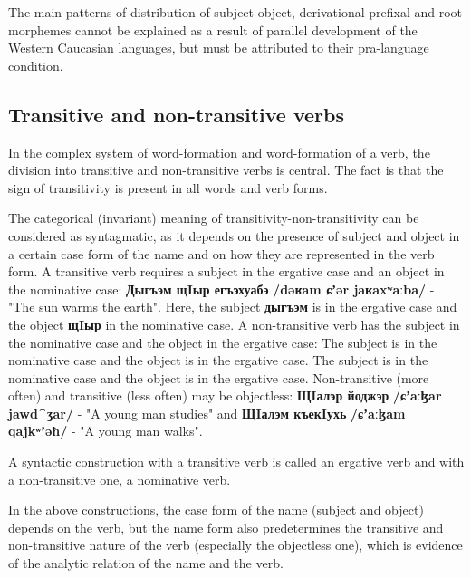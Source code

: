 \documentclass[a4paper,12pt]{book}
\newcommand{\1}[1]{\textbf{\emph{#1}}} %
\newcommand{\2}[1]{\textbf{[#1]}} %
\newcommand{\3}[1]{\fontsize{11pt}{0cm}\textbf{\emph{#1}}} %
\newcommand{\4}[1]{\fontsize{10pt}{0cm}\emph{#1}}	%
\newcommand{\5}[1]{\textbf{/#1/}} %
\newcommand{\6}[1]{\textbf{[#1]}} %
\newcommand{\7}[1]{\fontsize{12pt}{0cm}\emph{#1}} %
\newcommand{\8}[1]{\fontsize{12pt}{0cm}`#1'} %
\newcommand{\9}[1]{\fontsize{12pt}{0cm}(lit. `#1')} %
\newcommand{\glossphonemics}[1]{\textbf{/#1/}} %
\begin{document}
The main patterns of distribution of subject-object, derivational prefixal and root morphemes cannot be explained as a result of parallel development of the Western Caucasian languages, but must be attributed to their pra-language condition.\\
\subsection{Transitive and non-transitive verbs}
In the complex system of word-formation and word-formation of a verb, the division into transitive and non-transitive verbs is central. The fact is that the sign of transitivity is present in all words and verb forms.

The categorical (invariant) meaning of transitivity-non-transitivity can be considered as syntagmatic, as it depends on the presence of subject and object in a certain case form of the name and on how they are represented in the verb form. A transitive verb requires a subject in the ergative case and an object in the nominative case: \textbf{Дыгъэм щIыр егъэхуабэ} \glossphonemics{dəʁam ɕʼər jaʁaxʷaːba} - "The sun warms the earth". Here, the subject \textbf{дыгъэм} is in the ergative case and the object \textbf{щIыр} in the nominative case. A non-transitive verb has the subject in the nominative case and the object in the ergative case: The subject is in the nominative case and the object is in the ergative case. The subject is in the nominative case and the object is in the ergative case. Non-transitive (more often) and transitive (less often) may be objectless: \textbf{ЩIалэр йоджэр} \glossphonemics{ɕʼaːɮar jawd⁀ʒar} - "A young man studies" and \textbf{ЩIалэм къекIухь} \glossphonemics{ɕʼaːɮam qajkʷʼəħ} - "A young man walks".

A syntactic construction with a transitive verb is called an ergative verb and with a non-transitive one, a nominative verb.

In the above constructions, the case form of the name (subject and object) depends on the verb, but the name form also predetermines the transitive and non-transitive nature of the verb (especially the objectless one), which is evidence of the analytic relation of the name and the verb.
\end{document}
